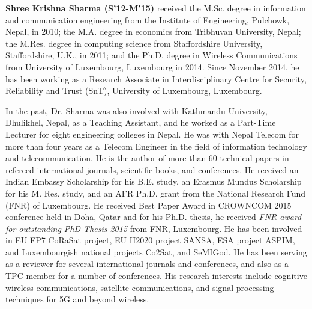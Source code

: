 \documentclass[journal, twocolumn]{IEEEtran}
\begin{document}
\begin{IEEEbiography}
{\textbf{Shree Krishna Sharma (S'12-M'15)}} received the M.Sc. degree in information and communication engineering from the Institute of Engineering, Pulchowk, Nepal, in 2010; the M.A. degree in economics from Tribhuvan University, Nepal; the M.Res. degree in computing science from Staffordshire University, Staffordshire, U.K., in 2011; and the Ph.D. degree in Wireless Communications from University of Luxembourg, Luxembourg in 2014. Since November 2014, he has been working as a Research Associate in Interdisciplinary Centre for Security, Reliability and Trust (SnT), University of Luxembourg, Luxembourg.

In the past, Dr. Sharma was also involved with Kathmandu University, Dhulikhel, Nepal, as a Teaching Assistant, and he worked as a Part-Time Lecturer for eight engineering colleges in Nepal. He was with Nepal Telecom for more than four years as a Telecom Engineer in the field of information technology and telecommunication. He is the author of more than 60 technical papers in refereed international journals, scientific books, and conferences. He received an Indian Embassy Scholarship for his B.E. study, an Erasmus Mundus Scholarship for his M. Res. study, and an AFR Ph.D. grant from the National Research Fund (FNR) of Luxembourg. He received Best Paper Award in CROWNCOM 2015 conference held in Doha, Qatar and for his Ph.D. thesis, he received \textit{FNR award for outstanding PhD Thesis 2015} from FNR, Luxembourg. He has been involved in EU FP7 CoRaSat project, EU H2020 project SANSA, ESA project ASPIM, and Luxembourgish national projects Co2Sat, and SeMIGod. He has been serving as a reviewer for several international journals and conferences, and also as a TPC member for a number of conferences. His research interests include cognitive wireless communications, satellite communications, and signal processing techniques for 5G and beyond wireless.
\end{IEEEbiography}
\end{document}
